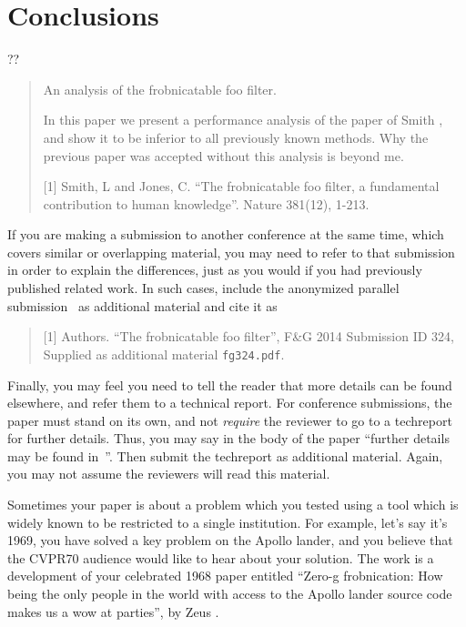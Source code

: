 \documentclass[10pt,twocolumn,letterpaper]{article}
\begin{document}
\section{Conclusions}

??

\begin{quote}
\begin{center}
     An analysis of the frobnicatable foo filter.
\end{center}

   In this paper we present a performance analysis of the paper of Smith \etal
   [1], and show it to be inferior to all previously known methods.  Why the
   previous paper was accepted without this analysis is beyond me.

   [1] Smith, L and Jones, C. ``The frobnicatable foo filter, a fundamental
   contribution to human knowledge''. Nature 381(12), 1-213.
\end{quote}

If you are making a submission to another conference at the same time, which
covers similar or overlapping material, you may need to refer to that submission
in order to explain the differences, just as you would if you had previously
published related work.  In such cases, include the anonymized parallel
submission~\cite{Authors14} as additional material and cite it as
\begin{quote}
[1] Authors. ``The frobnicatable foo filter'', F\&G 2014 Submission ID 324,
Supplied as additional material {\tt fg324.pdf}.
\end{quote}

Finally, you may feel you need to tell the reader that more details can be found
elsewhere, and refer them to a technical report.  For conference submissions,
the paper must stand on its own, and not {\em require} the reviewer to go to a
techreport for further details.  Thus, you may say in the body of the paper
``further details may be found in~\cite{Authors14b}''.  Then submit the
techreport as additional material. Again, you may not assume the reviewers will
read this material.

Sometimes your paper is about a problem which you tested using a tool which is
widely known to be restricted to a single institution.  For example, let's say
it's 1969, you have solved a key problem on the Apollo lander, and you believe
that the CVPR70 audience would like to hear about your solution.  The work is a
development of your celebrated 1968 paper entitled ``Zero-g frobnication: How
being the only people in the world with access to the Apollo lander source code
makes us a wow at parties'', by Zeus \etal.
\end{document}

